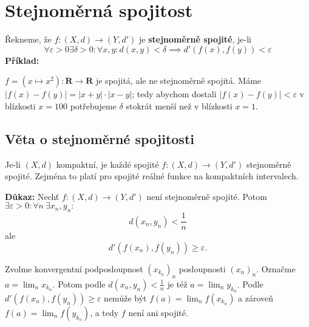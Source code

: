 \documentclass[../main.tex]{subfiles}
\begin{document}
\section{Stejnoměrná spojitost}
Řekneme, že $f : (X,d) \rightarrow (Y,d')$ je \textbf{stejnoměrně spojité}, je-li
\[\forall \varepsilon > 0 \exists \delta > 0 : \forall x,y : d(x,y) < \delta \implies d'(f(x),f(y)) < \varepsilon\]
\noindent
\textbf{Příklad:}

$f = (x \mapsto x^2) : \mathbf{R} \rightarrow \mathbf{R}$ je spojitá, ale ne stejnoměrně spojitá.
Máme $|f(x) - f(y)| = |x+y| \cdot |x-y|$; tedy abychom dostali $|f(x)-f(y)| < \varepsilon $ v 
blízkosti $x = 100$ potřebujeme $\delta$ stokrát menší než v blízkosti $x = 1$.

\subsection{Věta o stejnoměrné spojitosti}
\hspace{1.2mm}
Je-li $(X,d)$ kompaktní, je každé spojité $f : (X,d) \rightarrow (Y,d')$ stejnoměrně spojité. Zejména to platí 
pro spojité reálné funkce na kompaktních intervalech.


\vspace{5mm}
\noindent
\textbf{Důkaz:} Nechť $f : (X,d) \rightarrow (Y,d')$ není stejnoměrně spojité. Potom $\exists \varepsilon > 0 : \forall n\ \exists x_n, y_n :$
\[d(x_n,y_n) < \frac{1}{n}\]
ale
\[d'(f(x_n),f(y_n)) \geq \varepsilon.\]

Zvolme konvergentní podposloupnost $(x_{k_n})_n$ posloupnosti $(x_n)_n$. Označme $a = \lim_n x_{k_n}.$ Potom podle $d(x_n,y_n) < \frac{1}{n}$ je též 
$a = \lim_n y_{k_n}.$ Podle $d'(f(x_n),f(y_n)) \geq \varepsilon$ nemůže být $f(a) = \lim_n f(x_{k_n})$ a zároveň $f(a) = \lim_n f(y_{k_n})$, 
a tedy $f$ není ani spojité.
\end{document}
